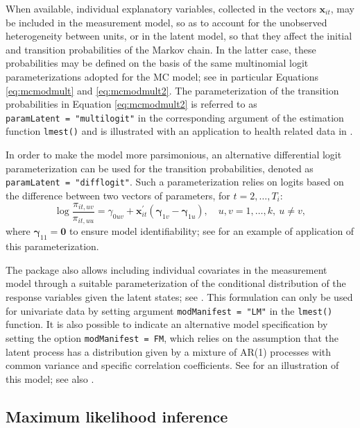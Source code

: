When available, individual explanatory variables, collected in the
vectors \(\boldsymbol{x}_{it}\), may be included in the measurement model, so as to
account for the unobserved heterogeneity between units, or in the latent
model, so that they affect the initial and transition probabilities of
the Markov chain. In the latter case, these probabilities may be defined
on the basis of the same multinomial logit parameterizations adopted for
the MC model; see in particular Equations \eqref{eq:mcmodmult} and
\eqref{eq:mcmodmult2}. The parameterization of the transition
probabilities in Equation \eqref{eq:mcmodmult2} is referred to as
\texttt{paramLatent\ =\ "multilogit"} in the corresponding argument of the
estimation function \texttt{lmest()} and is illustrated with an application to
health related data in \cite{bart:pand:penn:17}.

In order to make the model more parsimonious, an alternative
differential logit parameterization can be used for the transition
probabilities, denoted as \texttt{paramLatent\ =\ "difflogit"}. Such a
parameterization relies on logits based on the difference between two
vectors of parameters, for \(t=2,\ldots,T_i\): \begin{equation}
\log\frac{\pi_{it,uv}} {\pi_{it,uu}} =
\gamma_{0uv} + \boldsymbol{x}_{it}^\prime (\boldsymbol{\gamma}_{1v}-\boldsymbol{\gamma}_{1u}),\quad u,v=1,\ldots,k, \: u\neq v,
\label{eq:hmtransd}
\end{equation} where \(\boldsymbol{\gamma}_{11}= \boldsymbol{0}\) to ensure model
identifiability; see \cite{bart:mont:pand:15} for an example of
application of this parameterization.

The  package also allows including individual covariates
in the measurement model through a suitable parameterization of the
conditional distribution of the response variables given the latent
states; see \cite{bart:pand:penn:17}. This formulation can only be used
for univariate data by setting argument \texttt{modManifest\ =\ "LM"} in the
\texttt{lmest()} function. It is also possible to indicate an alternative model
specification by setting the option \texttt{modManifest\ =\ FM}, which relies on
the assumption that the latent process has a distribution given by a
mixture of AR(1) processes with common variance and specific correlation
coefficients. See \cite{bart:bacc:penn:14} for an illustration of this
model; see also \cite{penn:vitt:13}.

\hypertarget{subsec:HMest}{%
\subsection{Maximum likelihood inference}\label{subsec:HMest}}

